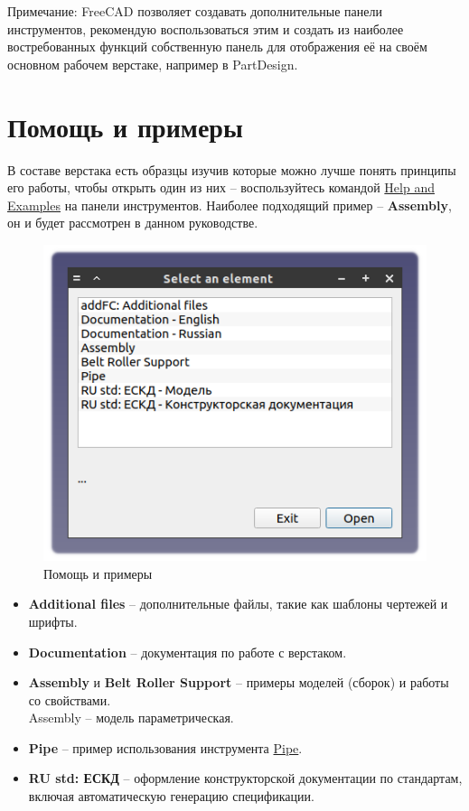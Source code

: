 \documentclass[a4paper,12pt]{article}
\begin{document}
Примечание: FreeCAD позволяет создавать дополнительные панели инструментов, рекомендую воспользоваться этим и создать из наиболее востребованных функций собственную панель для отображения её на своём основном рабочем верстаке, например в PartDesign.

\pagebreak




\section{Помощь и примеры}

В составе верстака есть образцы изучив которые можно лучше понять принципы его работы, чтобы открыть один из них -- воспользуйтесь командой \hyperref[sec:9]{Help and Examples} на панели инструментов. Наиболее подходящий пример -- \textbf{Assembly}, он и будет рассмотрен в данном руководстве.

\begin{figure}[htp]
	\centering
	\includegraphics[scale=1]{img/assistant.png}
	\caption{Помощь и примеры}
	\label{sec:assistant}
\end{figure}

\begin{itemize}
	\item \textbf{Additional files} -- дополнительные файлы, такие как шаблоны чертежей и шрифты.
	\item \textbf{Documentation} -- документация по работе с верстаком.
	\item \textbf{Assembly} и \textbf{Belt Roller Support} -- примеры моделей (сборок) и работы со свойствами.\\Assembly -- модель параметрическая.
	\item \textbf{Pipe} -- пример использования инструмента \hyperref[sec:6]{Pipe}.
	\item \textbf{RU std: ЕСКД} -- оформление конструкторской документации по стандартам,\\включая автоматическую генерацию спецификации.
\end{itemize}
\end{document}
